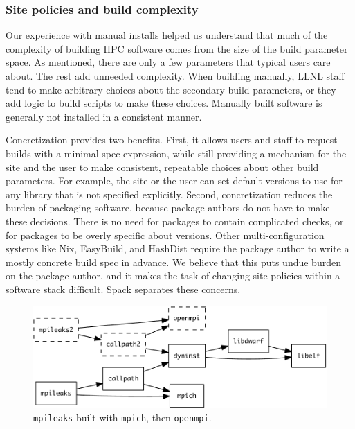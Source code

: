 \subsubsection{Site policies and build complexity}

Our experience with manual installs helped us understand that much of the complexity
of building HPC software comes from the size of the build parameter space.
As mentioned, there are only a few parameters that typical users care about.
The rest add unneeded complexity.  When building manually, LLNL staff
tend to make arbitrary choices about the secondary build parameters,
or they add logic to build scripts to make these choices.
Manually built software is generally not installed in a consistent manner.

Concretization provides two benefits.  First, it allows users and staff to
request builds with a minimal spec expression, while still providing a
mechanism for the site and the user to make consistent, repeatable choices about
other build parameters.  For example, the site or the user can set default versions
to use for any library that is not specified explicitly.
%
Second, concretization reduces the burden of packaging software, because
package authors do not have to make these decisions.  There is no
need for packages to contain complicated checks, or for packages to be overly
specific about versions.  Other multi-configuration systems like Nix, EasyBuild,
and HashDist require the package author to write a mostly concrete build spec in advance.
We believe that this puts undue burden on the package author, and it makes the task
of changing site policies within a software stack difficult.  Spack
separates these concerns.

\begin{figure}\centering
   \includegraphics[width=.9\linewidth]{specs/rpaths.pdf}
   \caption{
       {\tt mpileaks} built with {\tt mpich}, then {\tt openmpi}.
       \label{fig:reuse}
   }
\end{figure}

